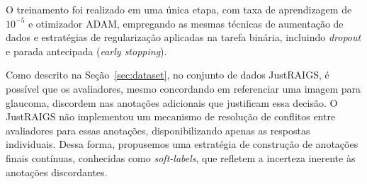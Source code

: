 \documentclass[12pt]{article}
\begin{document}
O treinamento foi realizado em uma única etapa, com taxa de aprendizagem de $10^{-5}$ e otimizador ADAM, empregando as mesmas técnicas de aumentação de dados e estratégias de regularização aplicadas na tarefa binária, incluindo \emph{dropout} e parada antecipada (\emph{early stopping}).

Como descrito na Seção~\ref{sec:dataset}, no conjunto de dados JustRAIGS, é possível que os avaliadores, mesmo concordando em referenciar uma imagem para glaucoma, discordem nas anotações adicionais que justificam essa decisão. O JustRAIGS não implementou um mecanismo de resolução de conflitos entre avaliadores para essas anotações, disponibilizando apenas as respostas individuais. Dessa forma, propusemos uma estratégia de construção de anotações finais contínuas, conhecidas como \emph{soft-labels}, que refletem a incerteza inerente às anotações discordantes.
\end{document}
